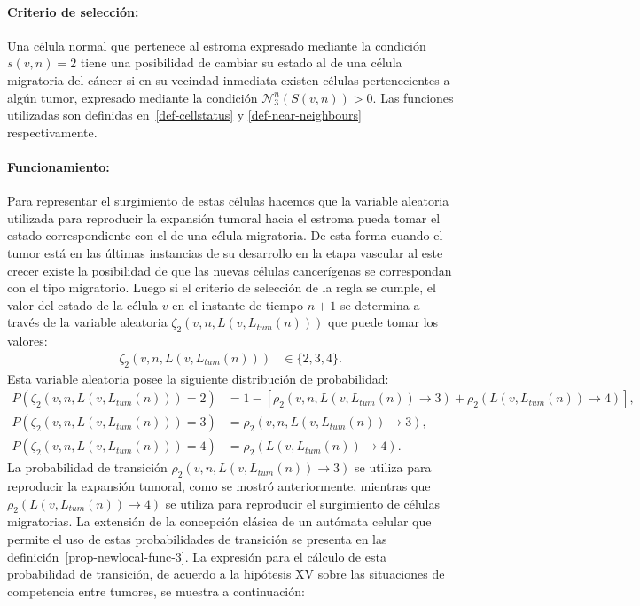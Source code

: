 \paragraph*{{Criterio de selecci\'on}:} Una c\'elula normal que pertenece al estroma expresado mediante la condici\'on $s(v,n)=2$ tiene una posibilidad de cambiar su estado al de una c\'elula migratoria del c\'ancer si en su vecindad inmediata existen c\'elulas pertenecientes a alg\'un tumor, expresado mediante la condici\'on $\mathcal{N}_3^n(S(v,n))>0$. Las funciones utilizadas son definidas en~\ref{def-cellstatus} y \ref{def-near-neighbours} respectivamente.

\paragraph*{{Funcionamiento}:} Para representar el surgimiento de estas c\'elulas hacemos que la variable aleatoria utilizada para reproducir la expansi\'on tumoral hacia el estroma pueda tomar el estado correspondiente con el de una c\'elula migratoria. De esta forma cuando el tumor est\'a en las \'ultimas instancias de su desarrollo en la etapa vascular al este crecer existe la posibilidad de que las nuevas c\'elulas cancer\'igenas se correspondan con el tipo migratorio. Luego si el criterio de selecci\'on de la regla se cumple, el valor del estado de la c\'elula $v$ en el instante de tiempo $n+1$ se determina a trav\'es de la variable aleatoria $\zeta_2(v,n,L(v,L_{tum}(n)))$ que puede tomar los valores:
\begin{align*}
\zeta_2(v,n,L(v,L_{tum}(n))) &\in \lbrace 2,3,4 \rbrace.
\end{align*}
Esta variable aleatoria posee la siguiente distribuci\'on de probabilidad:
\begin{align*}
P(\zeta_2(v,n,L(v,L_{tum}(n)))=2) &= 1 - \left[\rho_2(v,n,L(v,L_{tum}(n)) \rightarrow 3) + \rho_2(L(v,L_{tum}(n)) \rightarrow 4)\right], \\
P(\zeta_2(v,n,L(v,L_{tum}(n)))=3) &= \rho_2(v,n,L(v,L_{tum}(n)) \rightarrow 3), \\
P(\zeta_2(v,n,L(v,L_{tum}(n)))=4) &= \rho_2(L(v,L_{tum}(n)) \rightarrow 4).
\end{align*}
La probabilidad de transici\'on $\rho_2(v,n,L(v,L_{tum}(n)) \rightarrow 3)$ se utiliza para reproducir la expansi\'on tumoral, como se mostr\'o anteriormente, mientras que $\rho_2(L(v,L_{tum}(n)) \rightarrow 4)$ se utiliza para reproducir el surgimiento de c\'elulas migratorias. La extensi\'on de la concepci\'on cl\'asica de un aut\'omata celular que permite el uso de estas probabilidades de transici\'on se presenta en las definici\'on~\ref{prop-newlocal-func-3}. La expresi\'on para el c\'alculo de esta probabilidad de transici\'on, de acuerdo a la hip\'otesis XV sobre las situaciones de competencia entre tumores, se muestra a continuaci\'on:
